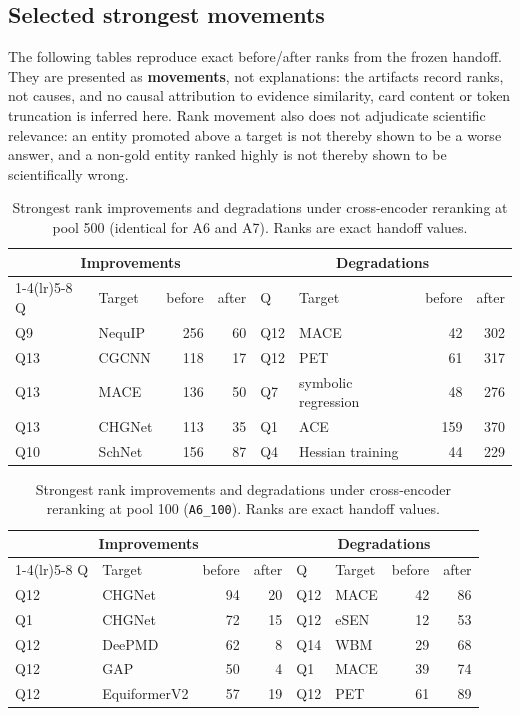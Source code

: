 \documentclass[11pt,a4paper]{article}
\begin{document}
\subsection{Selected strongest movements}

The following tables reproduce exact before/after ranks from the frozen handoff. They are presented as
\textbf{movements}, not explanations: the artifacts record ranks, not causes, and no causal attribution to
evidence similarity, card content or token truncation is inferred here. Rank movement also does not
adjudicate scientific relevance: an entity promoted above a target is not thereby shown to be a worse answer,
and a non-gold entity ranked highly is not thereby shown to be scientifically wrong.

\begin{table}[htbp]
\centering
\small
\caption{Strongest rank improvements and degradations under cross-encoder reranking at pool 500 (identical
for A6 and A7). Ranks are exact handoff values.}
\label{tab:mov500}
\begin{tabular}{llrr@{\qquad}llrr}
\toprule
\multicolumn{4}{c}{Improvements} & \multicolumn{4}{c}{Degradations} \\
\cmidrule(lr){1-4}\cmidrule(lr){5-8}
Q & Target & before & after & Q & Target & before & after \\
\midrule
Q9  & NequIP & 256 & 60 & Q12 & MACE                & 42 & 302 \\
Q13 & CGCNN  & 118 & 17 & Q12 & PET                 & 61 & 317 \\
Q13 & MACE   & 136 & 50 & Q7  & symbolic regression & 48 & 276 \\
Q13 & CHGNet & 113 & 35 & Q1  & ACE                 & 159 & 370 \\
Q10 & SchNet & 156 & 87 & Q4  & Hessian training    & 44 & 229 \\
\bottomrule
\end{tabular}
\end{table}

\begin{table}[htbp]
\centering
\small
\caption{Strongest rank improvements and degradations under cross-encoder reranking at pool 100
(\texttt{A6\_100}). Ranks are exact handoff values.}
\label{tab:mov100}
\begin{tabular}{llrr@{\qquad}llrr}
\toprule
\multicolumn{4}{c}{Improvements} & \multicolumn{4}{c}{Degradations} \\
\cmidrule(lr){1-4}\cmidrule(lr){5-8}
Q & Target & before & after & Q & Target & before & after \\
\midrule
Q12 & CHGNet       & 94 & 20 & Q12 & MACE & 42 & 86 \\
Q1  & CHGNet       & 72 & 15 & Q12 & eSEN & 12 & 53 \\
Q12 & DeePMD       & 62 &  8 & Q14 & WBM  & 29 & 68 \\
Q12 & GAP          & 50 &  4 & Q1  & MACE & 39 & 74 \\
Q12 & EquiformerV2 & 57 & 19 & Q12 & PET  & 61 & 89 \\
\bottomrule
\end{tabular}
\end{table}
\end{document}
